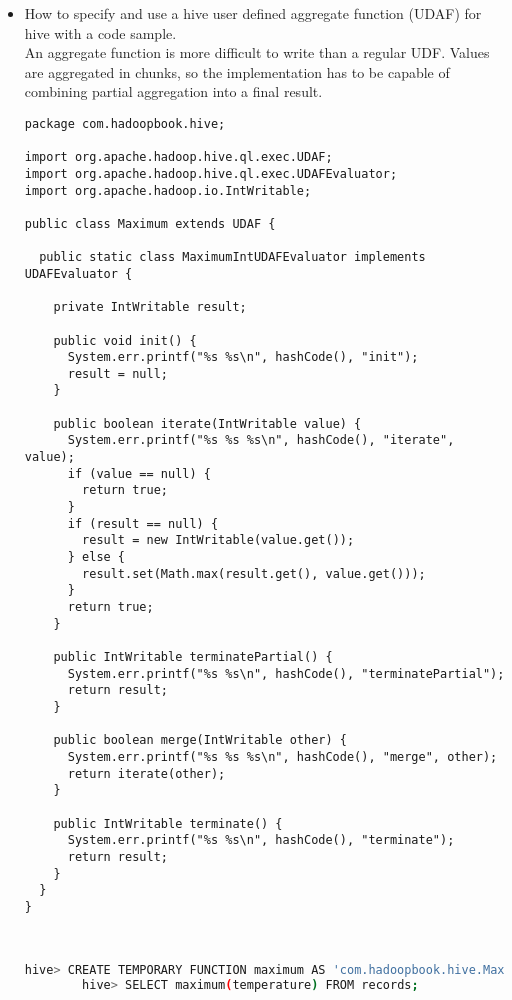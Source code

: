 \documentclass[12pt]{article}
\begin{document}
	\begin{itemize}
		\item How to specify and use a hive user defined aggregate function (UDAF) for hive with a code sample. \\
		An aggregate function is more difficult to write than  a regular UDF. Values are aggregated in chunks, so the implementation has to be capable of combining partial aggregation into a final result.           
		\begin{verbatim}
package com.hadoopbook.hive;

import org.apache.hadoop.hive.ql.exec.UDAF;
import org.apache.hadoop.hive.ql.exec.UDAFEvaluator;
import org.apache.hadoop.io.IntWritable;

public class Maximum extends UDAF {

  public static class MaximumIntUDAFEvaluator implements UDAFEvaluator {
    
    private IntWritable result;
    
    public void init() {
      System.err.printf("%s %s\n", hashCode(), "init");
      result = null;
    }

    public boolean iterate(IntWritable value) {
      System.err.printf("%s %s %s\n", hashCode(), "iterate", value);
      if (value == null) {
        return true;
      }
      if (result == null) {
        result = new IntWritable(value.get());
      } else {
        result.set(Math.max(result.get(), value.get()));
      }
      return true;
    }

    public IntWritable terminatePartial() {
      System.err.printf("%s %s\n", hashCode(), "terminatePartial");
      return result;
    }

    public boolean merge(IntWritable other) {
      System.err.printf("%s %s %s\n", hashCode(), "merge", other);
      return iterate(other);
    }

    public IntWritable terminate() {
      System.err.printf("%s %s\n", hashCode(), "terminate");
      return result;
    }
  }
}
                                                                                                                                                                                                                                                                                                                                                                                                                                                             
		                                                                                                                                                                                                                                     
		\end{verbatim}
		
		\begin{lstlisting}[language=bash]
		hive> CREATE TEMPORARY FUNCTION maximum AS 'com.hadoopbook.hive.Maximun';
		hive> SELECT maximum(temperature) FROM records;
		\end{lstlisting}	
	\end{itemize}
	
\end{document}
